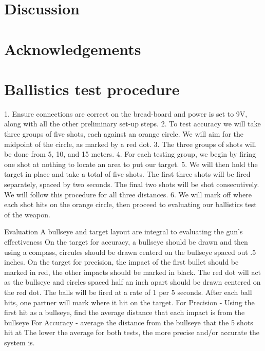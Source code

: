 \documentclass{article}
\begin{document}
\section{Discussion}
\section{Acknowledgements}





\appendix
\section{Ballistics test procedure}
\label{app:A}
1. Ensure connections are correct on the bread-board and power is set to 9V, along with all the other preliminary set-up steps.
2. To test accuracy we will take three groups of five shots, each against an orange circle. We will aim for the midpoint of the circle, as marked by a red dot.
3. The three groups of shots will be done from 5, 10, and 15 meters.
4. For each testing group, we begin by firing one shot at nothing to locate an area to put our target.
5. We will then hold the target in place and take a total of five shots. The first three shots will be fired separately, spaced by two seconds. The final two shots will be shot consecutively. We will follow this procedure for all three distances. 
6. We will mark off where each shot hits on the orange circle, then proceed to evaluating our ballistics test of the weapon.
 
Evaluation
A bullseye and target layout are integral to evaluating the gun’s effectiveness
On the target for accuracy, a bullseye should be drawn and then using a compass, circules should be drawn centerd on the bullseye spaced out .5 inches.
On the target for precision, the impact of the first bullet should be marked in red, the other impacts should be marked in black. The red dot will act as the bullseye and circles spaced half an inch apart should be drawn centered on the red dot.
The balls will be fired at a rate of 1 per 5 seconds. After each ball hits, one partner will mark where it hit on the target. 
For Precision - Using the first hit as a bullseye, find the average distance that each impact is from the bullseye
For Accuracy - average the distance from the bullseye that the 5 shots hit at
The lower the average for both tests, the more precise and/or accurate the system is.
\end{document}

